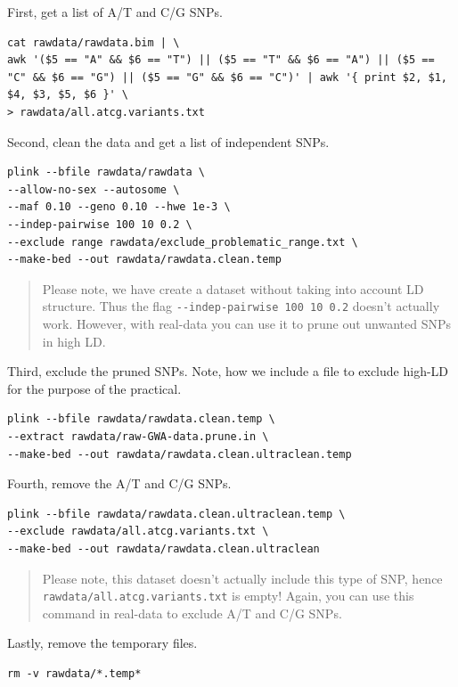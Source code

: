 \documentclass[
]{book}
\begin{document}
First, get a list of A/T and C/G SNPs.

\begin{verbatim}
cat rawdata/rawdata.bim | \
awk '($5 == "A" && $6 == "T") || ($5 == "T" && $6 == "A") || ($5 == "C" && $6 == "G") || ($5 == "G" && $6 == "C")' | awk '{ print $2, $1, $4, $3, $5, $6 }' \
> rawdata/all.atcg.variants.txt
\end{verbatim}

Second, clean the data and get a list of independent SNPs.

\begin{verbatim}
plink --bfile rawdata/rawdata \
--allow-no-sex --autosome \
--maf 0.10 --geno 0.10 --hwe 1e-3 \
--indep-pairwise 100 10 0.2 \
--exclude range rawdata/exclude_problematic_range.txt \
--make-bed --out rawdata/rawdata.clean.temp
\end{verbatim}

\begin{quote}
Please note, we have create a dataset without taking into account LD structure. Thus the flag \texttt{-\/-indep-pairwise\ 100\ 10\ 0.2} doesn't actually work. However, with real-data you can use it to prune out unwanted SNPs in high LD.
\end{quote}

Third, exclude the pruned SNPs. Note, how we include a file to exclude high-LD for the purpose of the practical.

\begin{verbatim}
plink --bfile rawdata/rawdata.clean.temp \
--extract rawdata/raw-GWA-data.prune.in \
--make-bed --out rawdata/rawdata.clean.ultraclean.temp
\end{verbatim}

Fourth, remove the A/T and C/G SNPs.

\begin{verbatim}
plink --bfile rawdata/rawdata.clean.ultraclean.temp \
--exclude rawdata/all.atcg.variants.txt \
--make-bed --out rawdata/rawdata.clean.ultraclean
\end{verbatim}

\begin{quote}
Please note, this dataset doesn't actually include this type of SNP, hence \texttt{rawdata/all.atcg.variants.txt} is empty! Again, you can use this command in real-data to exclude A/T and C/G SNPs.
\end{quote}

Lastly, remove the temporary files.

\begin{verbatim}
rm -v rawdata/*.temp*
\end{verbatim}
\end{document}
